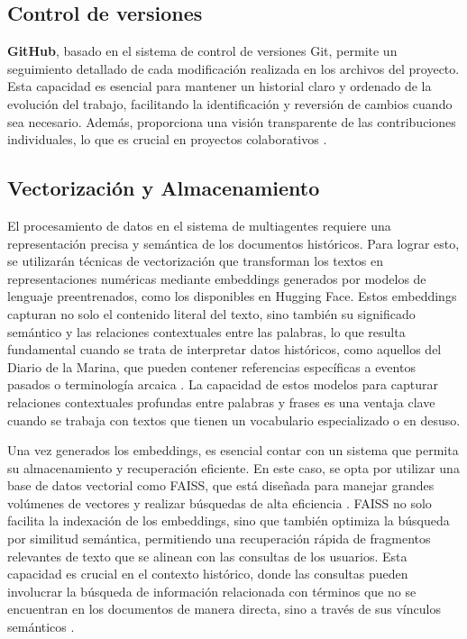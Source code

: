 \subsection{Control de versiones}

\textbf{GitHub}, basado en el sistema de control de versiones Git, permite un seguimiento detallado de cada modificación realizada en los archivos del proyecto. Esta capacidad es esencial para mantener un historial claro y ordenado de la evolución del trabajo, facilitando la identificación y reversión de cambios cuando sea necesario. Además, proporciona una visión transparente de las contribuciones individuales, lo que es crucial en proyectos colaborativos \cite{github_version_control,github_academic}. 

\subsection{Vectorización y Almacenamiento}

El procesamiento de datos en el sistema de multiagentes requiere una representación precisa y semántica de los documentos históricos. Para lograr esto, se utilizarán técnicas de vectorización que transforman los textos en representaciones numéricas mediante embeddings generados por modelos de lenguaje preentrenados, como los disponibles en Hugging Face. Estos embeddings capturan no solo el contenido literal del texto, sino también su significado semántico y las relaciones contextuales entre las palabras, lo que resulta fundamental cuando se trata de interpretar datos históricos, como aquellos del Diario de la Marina, que pueden contener referencias específicas a eventos pasados o terminología arcaica \cite{devlin2018bert, reimers2019sentence}. La capacidad de estos modelos para capturar relaciones contextuales profundas entre palabras y frases es una ventaja clave cuando se trabaja con textos que tienen un vocabulario especializado o en desuso.

Una vez generados los embeddings, es esencial contar con un sistema que permita su almacenamiento y recuperación eficiente. En este caso, se opta por utilizar una base de datos vectorial como FAISS, que está diseñada para manejar grandes volúmenes de vectores y realizar búsquedas de alta eficiencia \cite{mikolov2013efficient}. FAISS no solo facilita la indexación de los embeddings, sino que también optimiza la búsqueda por similitud semántica, permitiendo una recuperación rápida de fragmentos relevantes de texto que se alinean con las consultas de los usuarios. Esta capacidad es crucial en el contexto histórico, donde las consultas pueden involucrar la búsqueda de información relacionada con términos que no se encuentran en los documentos de manera directa, sino a través de sus vínculos semánticos \cite{mikolov2013efficient}.

